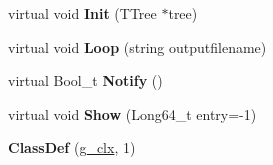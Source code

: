 \begin{DoxyCompactItemize}
virtual void {\bfseries Init} (T\+Tree $\ast$tree)
\item 
\mbox{\label{classg__clx_aeb5d4743fbc3fa60d189ed91e4c6e246}} 
virtual void {\bfseries Loop} (string outputfilename)
\item 
\mbox{\label{classg__clx_a1fe81316168bc18dc2325ca5595577a9}} 
virtual Bool\+\_\+t {\bfseries Notify} ()
\item 
\mbox{\label{classg__clx_ae86183470c7bb8db45753aa4c86f1d41}} 
virtual void {\bfseries Show} (Long64\+\_\+t entry=-\/1)
\item 
\mbox{\label{classg__clx_a8d0a8ed3a7cc55ca97aeb77f4183d3b8}} 
{\bfseries Class\+Def} (\hyperlink{classg__clx}{g\+\_\+clx}, 1)
\end{DoxyCompactItemize}
